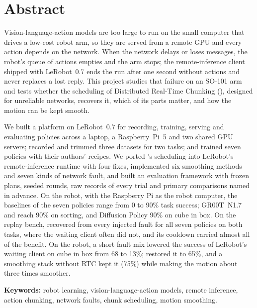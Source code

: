 \chapter*{Abstract}
\thispagestyle{plain}

Vision-language-action models are too large to run on the small computer that drives a low-cost robot arm, so they are
served from a remote GPU and every action depends on the network. When the network delays or loses messages, the
robot's queue of actions empties and the arm stops; the remote-inference client shipped with LeRobot~0.7 ends the run
after one second without actions and never replaces a lost reply. This project studies that failure on an SO-101 arm
and tests whether the scheduling of Distributed Real-Time Chunking (\drtc), designed for unreliable networks, recovers
it, which of its parts matter, and how the motion can be kept smooth.

We built a platform on LeRobot~0.7 for recording, training, serving and evaluating policies across a laptop, a
Raspberry~Pi~5 and two shared GPU servers; recorded and trimmed three datasets for two tasks; and trained seven policies
with their authors' recipes. We ported \drtc's scheduling into LeRobot's remote-inference runtime with four fixes,
implemented six smoothing methods and seven kinds of network fault, and built an evaluation framework with frozen plans,
seeded rounds, raw records of every trial and primary comparisons named in advance. On the robot, with the Raspberry Pi
as the robot computer, the baselines of the seven policies range from 0 to 90\% task success; GR00T~N1.7 and \smolvla{}
reach 90\% on sorting, and Diffusion Policy 90\% on cube in box.
On the replay bench, \drtc{} recovered from every injected fault for all seven policies on both tasks, where the
waiting client often did not, and its cooldown carried almost all of the benefit. On the robot, a short fault mix
lowered the success of LeRobot's waiting client on cube in box from 68 to 13\%; \drtc{} restored it to 65\%, and a
smoothing stack without RTC kept it (75\%) while making the motion about three times smoother.

\vspace{1em}
\noindent\textbf{Keywords:} robot learning, vision-language-action models, remote inference, action chunking,
network faults, chunk scheduling, motion smoothing.
